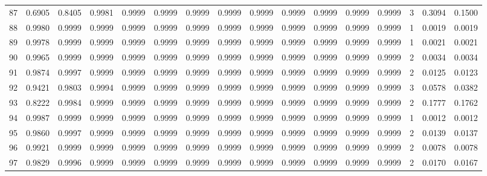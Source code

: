 \begin{tabular}{lrrrrrrrrrrrrrrr}
87  &      0.6905 &  0.8405 &  0.9981 &  0.9999 &  0.9999 &  0.9999 &  0.9999 &  0.9999 &  0.9999 &  0.9999 &   0.9999 &     0.9999 &      3 &                    0.3094 &                     0.1500 \\
88  &      0.9980 &  0.9999 &  0.9999 &  0.9999 &  0.9999 &  0.9999 &  0.9999 &  0.9999 &  0.9999 &  0.9999 &   0.9999 &     0.9999 &      1 &                    0.0019 &                     0.0019 \\
89  &      0.9978 &  0.9999 &  0.9999 &  0.9999 &  0.9999 &  0.9999 &  0.9999 &  0.9999 &  0.9999 &  0.9999 &   0.9999 &     0.9999 &      1 &                    0.0021 &                     0.0021 \\
90  &      0.9965 &  0.9999 &  0.9999 &  0.9999 &  0.9999 &  0.9999 &  0.9999 &  0.9999 &  0.9999 &  0.9999 &   0.9999 &     0.9999 &      2 &                    0.0034 &                     0.0034 \\
91  &      0.9874 &  0.9997 &  0.9999 &  0.9999 &  0.9999 &  0.9999 &  0.9999 &  0.9999 &  0.9999 &  0.9999 &   0.9999 &     0.9999 &      2 &                    0.0125 &                     0.0123 \\
92  &      0.9421 &  0.9803 &  0.9994 &  0.9999 &  0.9999 &  0.9999 &  0.9999 &  0.9999 &  0.9999 &  0.9999 &   0.9999 &     0.9999 &      3 &                    0.0578 &                     0.0382 \\
93  &      0.8222 &  0.9984 &  0.9999 &  0.9999 &  0.9999 &  0.9999 &  0.9999 &  0.9999 &  0.9999 &  0.9999 &   0.9999 &     0.9999 &      2 &                    0.1777 &                     0.1762 \\
94  &      0.9987 &  0.9999 &  0.9999 &  0.9999 &  0.9999 &  0.9999 &  0.9999 &  0.9999 &  0.9999 &  0.9999 &   0.9999 &     0.9999 &      1 &                    0.0012 &                     0.0012 \\
95  &      0.9860 &  0.9997 &  0.9999 &  0.9999 &  0.9999 &  0.9999 &  0.9999 &  0.9999 &  0.9999 &  0.9999 &   0.9999 &     0.9999 &      2 &                    0.0139 &                     0.0137 \\
96  &      0.9921 &  0.9999 &  0.9999 &  0.9999 &  0.9999 &  0.9999 &  0.9999 &  0.9999 &  0.9999 &  0.9999 &   0.9999 &     0.9999 &      2 &                    0.0078 &                     0.0078 \\
97  &      0.9829 &  0.9996 &  0.9999 &  0.9999 &  0.9999 &  0.9999 &  0.9999 &  0.9999 &  0.9999 &  0.9999 &   0.9999 &     0.9999 &      2 &                    0.0170 &                     0.0167 \\

\end{tabular}
